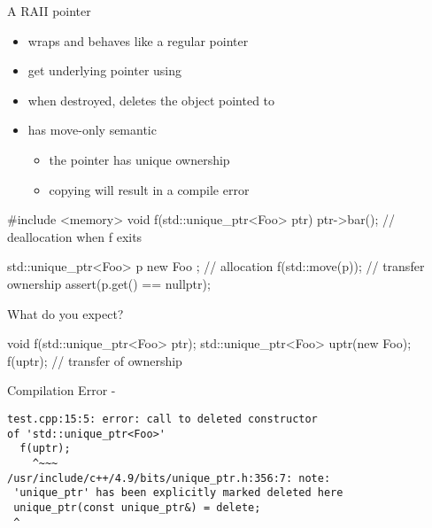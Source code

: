 \begin{frame}[fragile]
  \begin{block}{A RAII pointer}
    \begin{itemize}
    \item wraps and behaves like a regular pointer
    \item get underlying pointer using 
    \item when destroyed, deletes the object pointed to
    \item has move-only semantic
      \begin{itemize}
      \item the pointer has unique ownership
      \item copying will result in a compile error
      \end{itemize}
    \end{itemize}
  \end{block}
  \pause
  \begin{exampleblock}{}
    \begin{cppcode*}{}
      #include <memory>
      void f(std::unique_ptr<Foo> ptr) {
        ptr->bar();
      } // deallocation when f exits

      std::unique_ptr<Foo> p{ new Foo{} }; // allocation
      f(std::move(p)); // transfer ownership
      assert(p.get() == nullptr);
    \end{cppcode*}
  \end{exampleblock}
\end{frame}

\begin{frame}[fragile]
  \begin{exampleblock}{What do you expect?}
    \begin{cppcode*}{}
      void f(std::unique_ptr<Foo> ptr);
      std::unique_ptr<Foo> uptr(new Foo{});
      f(uptr); // transfer of ownership
    \end{cppcode*}
  \end{exampleblock}
  \pause
  \begin{alertblock}{Compilation Error - }
    \begin{verbatim}
test.cpp:15:5: error: call to deleted constructor
of 'std::unique_ptr<Foo>'
  f(uptr);
    ^~~~
/usr/include/c++/4.9/bits/unique_ptr.h:356:7: note:
 'unique_ptr' has been explicitly marked deleted here
 unique_ptr(const unique_ptr&) = delete;
 ^
    \end{verbatim}
  \end{alertblock}
\end{frame}

